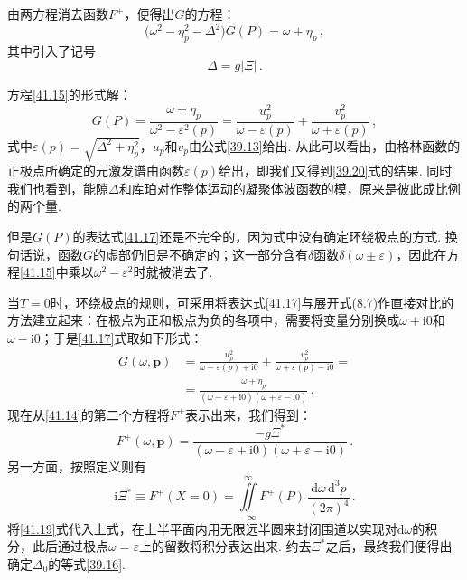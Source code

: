 由两方程消去函数$F^{+}$，便得出$G$的方程：
\begin{equation}
\bigl(\omega^2-\eta_p^2-\Delta^2\bigr)G(P) = \omega+\eta_p\,,
\label{41.15}
\end{equation}
其中引入了记号
\begin{equation}
\Delta = g|\Xi|\,.
\label{41.16}
\end{equation}

方程\eqref{41.15}的形式解：
\begin{equation}
G(P) = \frac{\omega+\eta_p}{\omega^2-\varepsilon^2(p)}
= \frac{u_p^2}{\omega-\varepsilon(p)} + \frac{v_p^2}{\omega+\varepsilon(p)}\,,
\label{41.17}
\end{equation}
式中$\varepsilon(p)=\sqrt{\Delta^2+\eta_p^2}$，$u_p$和$v_p$由公式\eqref{39.13}给出. 从此可以看出，由格林函数的正极点所确定的元激发谱由函数$\varepsilon(p)$给出，即我们又得到\eqref{39.20}式的结果. 同时我们也看到，能隙$\Delta$和库珀对作整体运动的凝聚体波函数的模，原来是彼此成比例的两个量.

但是$G(P)$的表达式\eqref{41.17}还是不完全的，因为式中没有确定环绕极点的方式. 换句话说，函数$G$的虚部仍旧是不确定的；这一部分含有$\delta$函数$\delta(\omega\pm\varepsilon)$，因此在方程\eqref{41.15}中乘以$\omega^2-\varepsilon^2$时就被消去了.

当$T=0$时，环绕极点的规则，可采用将表达式\eqref{41.17}与展开式(8.7)作直接对比的方法建立起来：在极点为正和极点为负的各项中，需要将变量分别换成$\omega+\mathrm i0$和$\omega-\mathrm i0$；于是\eqref{41.17}式取如下形式：
\begin{equation}
\begin{aligned}
G(\omega,\bm p) &= \frac{u_p^2}{\omega-\varepsilon(p)+\mathrm i0}
+ \frac{v_p^2}{\omega+\varepsilon(p)-\mathrm i0} = {}\\
&= \frac{\omega+\eta_p}{(\omega-\varepsilon+\mathrm i0)(\omega+\varepsilon-\mathrm i0)}\,.
\end{aligned}
\label{41.18}
\end{equation}
现在从\eqref{41.14}的第二个方程将$F^{+}$表示出来，我们得到：
\begin{equation}
F^{+}(\omega,\bm p) = \frac{-g\Xi^{*}}{(\omega-\varepsilon+\mathrm i0)(\omega+\varepsilon-\mathrm i0)}\,.
\label{41.19}
\end{equation}
另一方面，按照定义则有
\begin{equation}
\mathrm i\Xi^{*} \equiv F^{+}(X=0) = \iint\limits_{-\infty}^{\infty}F^{+}(P)\,\frac{\mathrm d\omega\,\mathrm d^3p}{(2\pi)^4}\,.
\label{41.20}
\end{equation}
将\eqref{41.19}式代入上式，在上半平面内用无限远半圆来封闭围道以实现对$\mathrm d\omega$的积分，此后通过极点$\omega=\varepsilon$上的留数将积分表达出来. 约去$\Xi^{*}$之后，最终我们便得出确定$\Delta_0$的等式\eqref{39.16}.

